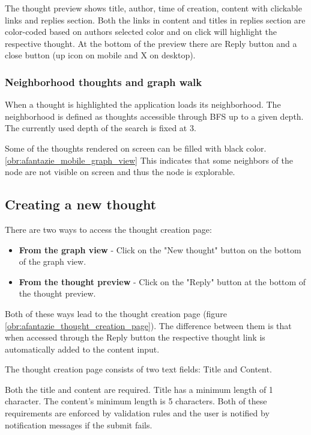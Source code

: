 The thought preview shows title, author, time of creation, content with clickable links and replies section.
Both the links in content and titles in replies section are color-coded based on authors selected color
and on click will highlight the respective thought.
At the bottom of the preview there are Reply button and a close button (up icon on mobile and X on desktop).

\subsubsection*{Neighborhood thoughts and graph walk}

When a thought is highlighted the application loads its neighborhood.
The neighborhood is defined as thoughts accessible through \gls{BFS} up to a given depth.
The currently used depth of the search is fixed at 3.

Some of the thoughts rendered on screen can be filled with black color. \ref{obr:afantazie_mobile_graph_view}
This indicates that some neighbors of the node are not visible on screen and thus the node is explorable.
  
\subsection{Creating a new thought}

There are two ways to access the thought creation page:
\begin{itemize}
  \item \textbf{From the graph view} - Click on the "New thought" button on the bottom of the graph view.
  \item \textbf{From the thought preview} - Click on the "Reply" button at the bottom of the thought preview.
\end{itemize}

Both of these ways lead to the thought creation page (figure \ref{obr:afantazie_thought_creation_page}).
The difference between them is that when accessed through the Reply button the respective thought link
is automatically added to the content input.

The thought creation page consists of two text fields: Title and Content.

Both the title and content are required. Title has a minimum length of 1 character. The content's minimum length is 5 characters.
Both of these requirements are enforced by validation rules and the user is notified by notification messages if the submit fails.


